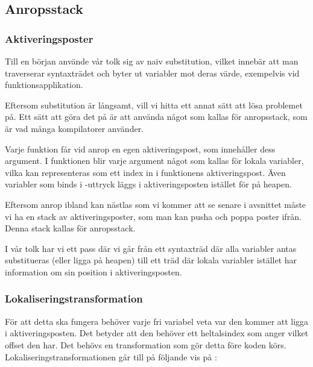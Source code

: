 \documentclass[../Core]{subfiles}
\begin{document}
\subsection{Anropsstack}
\label{sec:CallStack}
\subsubsection{Aktiveringsposter}

Till en början använde vår tolk sig av naiv substitution, vilket innebär att man
traverserar syntaxträdet och byter ut variabler mot deras värde, exempelvis vid
funktionsapplikation.

Eftersom substitution är långsamt, vill vi hitta ett annat sätt att lösa problemet
på. Ett sätt att göra det på är att använda något som kallas för anropsstack, som
är vad många kompilatorer använder. %

Varje funktion får vid anrop en egen aktiveringspost, som innehåller dess argument.
I funktionen blir varje argument något som kallas för lokala variabler, vilka kan representeras
som ett index in i funktionens aktiveringspost. Även variabler som binds i
-uttryck läggs i aktiveringsposten istället för på heapen. 
  
Eftersom anrop ibland kan nästlas som vi kommer att se senare i avsnittet
måste vi ha en stack av aktiveringsposter, som man kan pusha och poppa poster ifrån.
Denna stack kallas för anropsstack.

I vår tolk har vi ett pass där vi går från ett syntaxträd där alla variabler
antas substitueras (eller ligga på heapen) till ett träd där lokala variabler
istället har information om sin position i aktiveringsposten.




\subsubsection{Lokaliseringstransformation}

För att detta ska fungera behöver varje fri variabel veta var den kommer att
ligga i aktiveringsposten. Det betyder att den behöver ett heltalsindex som anger
vilket offset den har. Det behövs en transformation som gör detta före koden 
körs. Lokaliseringstransformationen går till på följande vis på : 
\end{document}
